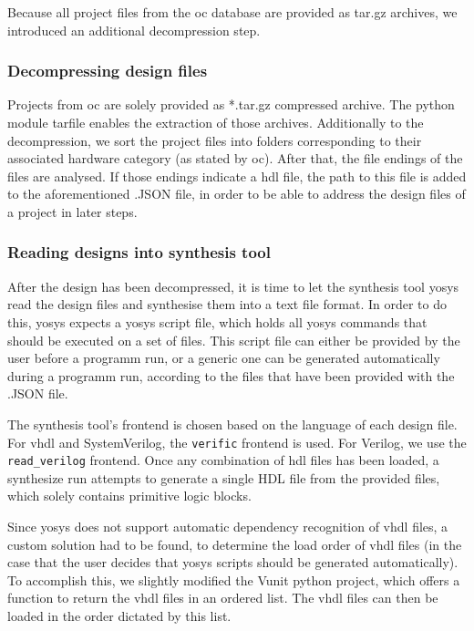 Because all project files from the \gls{oc} database are provided as tar.gz archives,
we introduced an additional decompression step.  

\subsubsection{Decompressing design files} 
Projects from \gls{oc} are solely provided as *.tar.gz compressed archive. The \gls{python}
module tarfile enables the extraction of those archives. Additionally 
to the decompression, we sort the project files into folders corresponding to 
their associated hardware category (as stated by \gls{oc}). After that, the file 
endings of the files are analysed. If those endings indicate a \gls{hdl} file, the path 
to this file is added to the aforementioned .JSON file, in order to be able to
address the design files of a project in later steps.

\subsubsection{Reading designs into synthesis tool} 
After the design has been decompressed, it is time to let the synthesis tool 
yosys read the design files and synthesise them into a text file format. In 
order to do this, yosys expects a yosys script file, which holds all yosys commands 
that should be executed on a set of files. This script file can either be provided
by the user before a programm run, or a generic one can be generated automatically 
during a programm run, according to the files that have been provided with the 
.JSON file. 

The synthesis tool's frontend is chosen based on the language of each design file.
For \gls{vhdl} and SystemVerilog, the \lstinline{verific} frontend is used. For Verilog,
we use the \lstinline{read_verilog} frontend. Once any combination of \gls{hdl} files
has been loaded, a synthesize run attempts to generate a single HDL file from the provided
files, which solely contains primitive logic blocks. 

Since yosys does not support automatic dependency recognition of vhdl files, a custom solution
had to be found, to determine the load order of vhdl files (in the case that the user decides
that yosys scripts should be generated automatically). To accomplish this, we slightly modified 
the Vunit python project, which offers a function to return the \gls{vhdl} 
files in an ordered list. The vhdl files can then be loaded in the order dictated by this list.  


